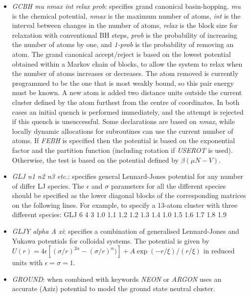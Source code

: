 \documentclass[12pt,a4paper,dvips]{article}
\begin{document}
\begin{itemize}
\item {\it GCBH mu nmax int relax prob}: specifies grand canonical basin-hopping.
{\it mu} is the chemical potential, {\it nmax} is the maximum number of atoms, 
{\it int} is the interval between changes in the number of atoms,
{\it relax} is the block size for relaxation with conventional BH steps,
{\it prob} is the probability of increasing the number of atoms by one,
and {\it 1-prob} is the probability of removing an atom.
The grand canonical accept/reject is based on the lowest potential obtained within
a Markov chain of blocks, to allow the system to relax when the number of atoms
increases or decreases.
The atom removed is currently programmed to be the one that is most weakly bound, so
this pair energy must be known.
A new atom is added two distance units outside the current cluster defined
by the atom furthest from the centre of coordinates.
In both cases an initial quench is performed immediately, and the attempt is rejected
if this quench is unsuccessful.
Some declarations are based on {\it nmax}, while locally dynamic allocations 
for subroutines can use the current number of atoms.
If {\it FEBH} is specified then the potential is based on the exponential factor
and the partition function (including rotation if {\it USEROT} is used).
Otherwise, the test is based on the potential defined by $\beta(\mu N-V)$.

\item {\it GLJ n1 n2 n3 etc.}: specifies general Lennard-Jones potential for any number of
differ LJ species.
The $\epsilon$ and $\sigma$ parameters for all the different species should be specified as
the lower diagonal blocks of the corresponding matrices on the following lines.
For example, to specify a 13-atom cluster with three different species:
{\obeylines
GLJ 6 4 3
1.0
1.1 1.2 
1.2 1.3 1.4
1.0
1.5 1.6
1.7 1.8 1.9
}

\item {\it GLJY alpha A xi}: specifies a combination of generalised Lennard-Jones and Yukawa potentials for colloidal systems. 
The potential is given by $U(r) = 4\epsilon \left[ (\sigma/r)^{2\alpha} - (\sigma/r)^{\alpha}) \right] + A \exp(-r/\xi) / (r/\xi)$
in reduced units with $\epsilon = \sigma = 1$.

\item {\it GROUND\/}: when combined with keywords {\it NEON\/} or {\it ARGON\/}
uses an accurate (Aziz) potential to model the ground state neutral cluster.


\end{itemize}
\end{document}
